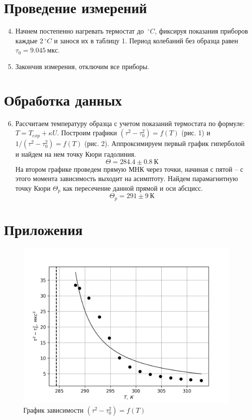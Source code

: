 \documentclass[14pt, a4paper]{report}
\begin{document}
	\section{Проведение измерений}	

		\begin{enumerate}
		
			\setcounter{enumi}{3}

			\item Начнем постепенно нагревать термостат до $\ ^\circ C$, фиксируя показания приборов каждые $2\ ^\circ C$ и занося их в таблицу 1.
			Период колебаний без образца равен $\tau_0=9.045\ мкс$.
	
			\item Закончив измерения, отключим все приборы.
		
		\end{enumerate}

	\section{Обработка данных}

		\begin{enumerate}
		
			\setcounter{enumi}{5}

			\item Рассчитаем температуру образца с учетом показаний термостата по формуле: $T=T_{exp}+\kappa U$. Построим графики $(\tau^2-\tau_0^2)=f(T)$ (рис. 1) и $1/(\tau^2-\tau_0^2)=f(T)$ (рис. 2). Аппроксимируем первый график гиперболой и найдем на нем точку Кюри гадолиния.
			\[\Theta=284.4\pm0.8\ К\]
			На втором графике проведем прямую МНК через точки, начиная с пятой -- с этого момента зависимость выходит на асимптоту. Найдем парамагнитную точку Кюри $\Theta_p$ как пересечение данной прямой и оси абсцисс.
			\[\Theta_p=291\pm9\ К\]

		\end{enumerate}
	
	\section{Приложения}
	
		\begin{figure}[h]
			\centering
			\includegraphics[width=0.75\linewidth]{images/342_1.png}
			\caption{График зависимости $(\tau^2-\tau_0^2)=f(T)$}
		\end{figure}
\end{document}
